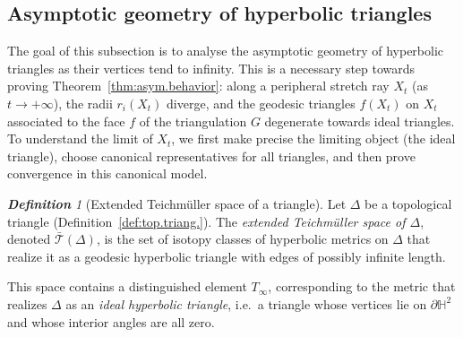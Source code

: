 \documentclass[11pt, letterpaper]{amsart}
\theoremstyle{definition}
\theoremstyle{remark}
\newtheorem{definition}[theorem]{\rm\bf Definition}
\newcommand{\cT}{\mathcal{T}}
\newcommand{\bH}{\mathbb{H}}
\newcommand{\DEF}{} \newcommand{\WARN}{\textcolor{red}} \newcommand{\ALT}{\textcolor{brown}} \newcommand{\TODO}{\textcolor{teal}} %
\numberwithin{equation}{section}
\begin{document}
\subsection{Asymptotic geometry of hyperbolic triangles}
\label{subsec:asymp.triang.}

The goal of this subsection is to analyse the asymptotic geometry of hyperbolic triangles as their vertices tend to infinity. 
This is a necessary step towards proving Theorem~\ref{thm:asym.behavior}: along a peripheral stretch ray \(X_t\) (as \(t \to +\infty\)), the radii \(r_i(X_t)\) diverge, and the geodesic triangles \(f(X_t)\) on $X_t$ associated to the face $f$ of the triangulation $G$ degenerate towards ideal triangles.
To understand the limit of \(X_t\), we first make precise the limiting object (the ideal triangle), choose canonical representatives for all triangles, and then prove convergence in this canonical model.

\begin{definition}[Extended Teichm\"uller space of a triangle]
\label{def:extend.Teich.of.hyp.triang.}
Let \(\Delta\) be a topological triangle (Definition~\ref{def:top.triang.}). 
The \DEF{\em extended Teichm\"uller space of \(\Delta\)}, denoted \(\bar{\cT}(\Delta)\), is the set of isotopy classes of hyperbolic metrics on \(\Delta\) that realize it as a geodesic hyperbolic triangle with edges of possibly infinite length.

This space contains a distinguished element \(T_{\infty}\), corresponding to the metric that realizes \(\Delta\) as an \DEF{\em ideal hyperbolic triangle}, i.e.\ a triangle whose vertices lie on \(\partial\bH^2\) and whose interior angles are all zero.
\end{definition}
\end{document}
